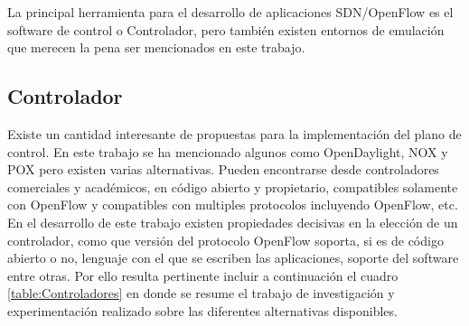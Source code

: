 La principal herramienta para el desarrollo de aplicaciones SDN/OpenFlow es el software de control o Controlador, pero también existen entornos de emulación que merecen la pena ser mencionados en este trabajo.

\subsection{Controlador}
Existe un cantidad interesante de propuestas para la implementaci\'on del plano de control. En este trabajo se ha mencionado algunos como OpenDaylight, NOX y POX pero existen varias alternativas. Pueden encontrarse desde controladores comerciales y académicos, en código abierto y propietario, compatibles solamente con OpenFlow y compatibles con multiples protocolos incluyendo OpenFlow, etc.\\   

En el desarrollo de este trabajo existen propiedades decisivas en la elecci\'on de un controlador, como que versi\'on del protocolo OpenFlow soporta, si es de código abierto o no, lenguaje con el que se escriben las aplicaciones, soporte del software entre otras. Por ello resulta pertinente incluir a continuación el cuadro \ref{table:Controladores} en donde se resume el trabajo de investigación y experimentación realizado sobre las diferentes alternativas disponibles. 

